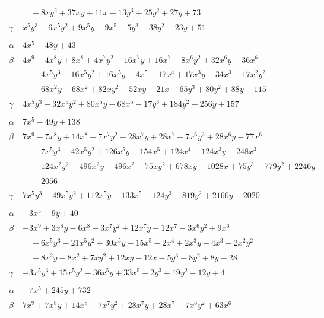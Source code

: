 \documentclass[11pt]{article}
\begin{document}
\begin{longtable}{@{}ll@{}}
 & $\quad +8xy^{2}+37xy+11x-13y^{3}+25y^{2}+27y+73$\\
$\gamma$ & $x^{5}y^{3}-6x^{5}y^{2}+9x^{5}y-9x^{5}-5y^{3}+38y^{2}-23y+51$\\
\addlinespace[3pt]
\multicolumn{2}{@{}l}{$\{i,j\}=\{15,25\}$, $k_{ij}=3^{2}\cdot 11$}\\
$\alpha$ & $4x^{5}-48y+43$\\
$\beta$ & $4x^{9}-4x^{8}y+8x^{8}+4x^{7}y^{2}-16x^{7}y+16x^{7}-8x^{6}y^{2}+32x^{6}y-36x^{6}$\\
 & $\quad +4x^{5}y^{3}-16x^{5}y^{2}+16x^{5}y-4x^{5}-17x^{4}+17x^{3}y-34x^{3}-17x^{2}y^{2}$\\
 & $\quad +68x^{2}y-68x^{2}+82xy^{2}-52xy+21x-65y^{3}+80y^{2}+88y-115$\\
$\gamma$ & $4x^{5}y^{3}-32x^{5}y^{2}+80x^{5}y-68x^{5}-17y^{3}+184y^{2}-256y+157$\\
\addlinespace[3pt]
\multicolumn{2}{@{}l}{$\{i,j\}=\{15,26\}$, $k_{ij}=2^{5}\cdot 3\cdot 5$}\\
$\alpha$ & $7x^{5}-49y+138$\\
$\beta$ & $7x^{9}-7x^{8}y+14x^{8}+7x^{7}y^{2}-28x^{7}y+28x^{7}-7x^{6}y^{2}+28x^{6}y-77x^{6}$\\
 & $\quad +7x^{5}y^{3}-42x^{5}y^{2}+126x^{5}y-154x^{5}+124x^{4}-124x^{3}y+248x^{3}$\\
 & $\quad +124x^{2}y^{2}-496x^{2}y+496x^{2}-75xy^{2}+678xy-1028x+75y^{3}-779y^{2}+2246y$\\
 & $\quad -2056$\\
$\gamma$ & $7x^{5}y^{3}-49x^{5}y^{2}+112x^{5}y-133x^{5}+124y^{3}-819y^{2}+2166y-2020$\\
\addlinespace[3pt]
\multicolumn{2}{@{}l}{$\{i,j\}=\{15,33\}$, $k_{ij}=2^{3}\cdot 13$}\\
$\alpha$ & $-3x^{5}-9y+40$\\
$\beta$ & $-3x^{9}+3x^{8}y-6x^{8}-3x^{7}y^{2}+12x^{7}y-12x^{7}-3x^{6}y^{2}+9x^{6}$\\
 & $\quad +6x^{5}y^{3}-21x^{5}y^{2}+30x^{5}y-15x^{5}-2x^{4}+2x^{3}y-4x^{3}-2x^{2}y^{2}$\\
 & $\quad +8x^{2}y-8x^{2}+7xy^{2}+12xy-12x-5y^{3}-8y^{2}+8y-28$\\
$\gamma$ & $-3x^{5}y^{3}+15x^{5}y^{2}-36x^{5}y+33x^{5}-2y^{3}+19y^{2}-12y+4$\\
\addlinespace[3pt]
\multicolumn{2}{@{}l}{$\{i,j\}=\{16,19\}$, $k_{ij}=2^{5}\cdot 3\cdot 5^{2}$}\\
$\alpha$ & $-7x^{5}+245y+732$\\
$\beta$ & $7x^{9}+7x^{8}y+14x^{8}+7x^{7}y^{2}+28x^{7}y+28x^{7}+7x^{6}y^{2}+63x^{6}$\\

\end{longtable}
\end{document}
